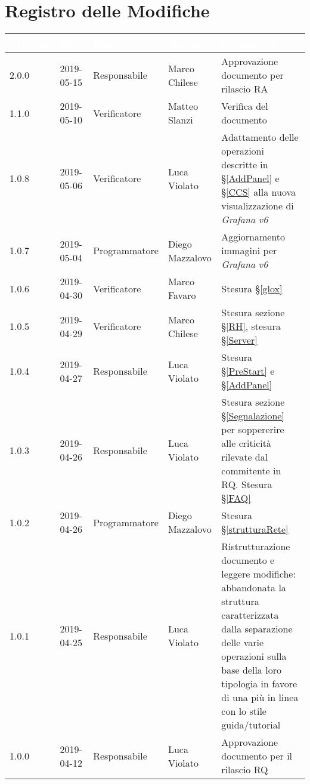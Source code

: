 \section*{Registro delle Modifiche}

\begin{center}
\begin{longtable}[c]{|m{}|m{}|m{}|m{}|p{}|}
\hline
\rowcolor{bluelogo}\textbf{\textcolor{white}{Versione}} & \textbf{\textcolor{white}{Data}} & \textbf{\textcolor{white}{Ruolo}} & \textbf{\textcolor{white}{Autore}} & \textbf{\textcolor{white}{Descrizione}} \\
\hline \hline
\endhead

2.0.0 & 2019-05-15 & Responsabile & Marco Chilese & Approvazione documento per rilascio RA\\
\hline
\rowcolor{grigio} 1.1.0 & 2019-05-10 & Verificatore & Matteo Slanzi & Verifica del documento \\ 
\hline
1.0.8 & 2019-05-06 & Verificatore & Luca Violato & Adattamento delle operazioni descritte in §\ref{AddPanel} e §\ref{CCS} alla nuova visualizzazione di \textit{Grafana v6}\\
\hline
\rowcolor{grigio}1.0.7 & 2019-05-04 & Programmatore & Diego Mazzalovo & Aggiornamento immagini per \textit{Grafana v6}\\
\hline
1.0.6 & 2019-04-30 & Verificatore & Marco Favaro & Stesura §\ref{glox}\\
\hline
\rowcolor{grigio}1.0.5 & 2019-04-29 & Verificatore & Marco Chilese & Stesura sezione §\ref{RH}, stesura §\ref{Server}\\
\hline
1.0.4 & 2019-04-27 & Responsabile & Luca Violato & Stesura §\ref{PreStart} e §\ref{AddPanel}\\
\hline
\rowcolor{grigio}1.0.3 & 2019-04-26 & Responsabile & Luca Violato & Stesura sezione §\ref{Segnalazione} per soppererire alle criticità rilevate dal commitente in RQ. Stesura §\ref{FAQ}\\
\hline
1.0.2 & 2019-04-26 & Programmatore & Diego Mazzalovo & Stesura §\ref{strutturaRete}\\
\hline
\rowcolor{grigio}1.0.1 & 2019-04-25 & Responsabile & Luca Violato & Ristrutturazione documento e leggere modifiche: abbandonata la struttura caratterizzata dalla separazione delle varie operazioni sulla base della loro tipologia in favore di una più in linea con lo stile guida/tutorial\\
\hline
1.0.0 & 2019-04-12 & Responsabile & Luca Violato & Approvazione documento per il rilascio RQ \\

\end{longtable}
\end{center}
